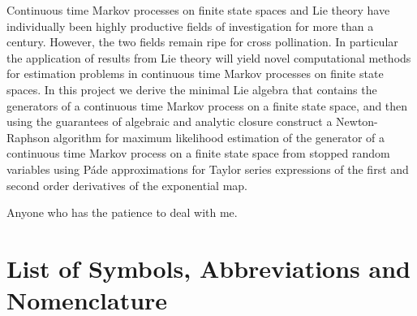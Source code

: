 \documentclass[12pt]{ucalgthes1}
\theoremstyle{definition}\newtheorem{definition}{Definition}
\begin{document}
	\newpage
	Continuous time Markov processes on finite state spaces and Lie theory have 
	individually been highly productive fields of investigation for more than a 
	century. However, the two fields remain ripe for cross pollination. In 
	particular the application of results from Lie theory will yield novel 
	computational methods for estimation problems in continuous time Markov 
	processes on finite state spaces. In this project we derive the minimal Lie 
	algebra that contains the generators of a continuous time Markov process on a 
	finite state space, and then using the guarantees of algebraic and analytic 
	closure construct a Newton-Raphson algorithm for maximum likelihood estimation 
	of the generator of a continuous time Markov process on a finite state space 
	from stopped random variables using P\'ade approximations for Taylor series 
	expressions of the first and second order derivatives of the exponential map.

	\newpage
	Anyone who has the patience to deal with me.

	\begin{singlespace}
		\newpage
		\tableofcontents
		\pagestyle{plain}
		\newpage
		\listoftables
		\pagestyle{plain}
		\newpage
		\listoffigures
		\pagestyle{plain}
		\clearpage
		\clearpage
	\end{singlespace}
	\newpage
	\chapter*{\bf{List of Symbols, Abbreviations and Nomenclature}\hfill} 
	\listofsymbols
	\pagestyle{plain}
	\clearpage

	
	
	
	
	
	\appendix
	
\end{document}
